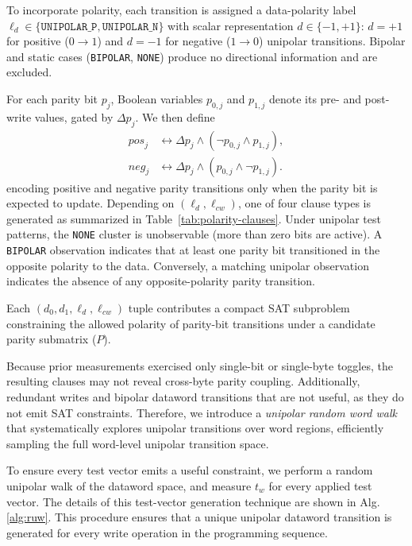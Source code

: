 \label{sec:sat-encoding}

To incorporate polarity, each transition is assigned a data-polarity label $\ell_d \in \{\texttt{UNIPOLAR\_P},\texttt{UNIPOLAR\_N}\}$ 
with scalar representation $d\in\{-1,+1\}$:
$d=+1$ for positive ($0{\rightarrow}1$) and $d=-1$ for negative ($1{\rightarrow}0$) unipolar transitions.
Bipolar and static cases (\texttt{BIPOLAR}, \texttt{NONE}) produce no directional information and are excluded.

For each parity bit $p_j$, Boolean variables $p_{0,j}$ and $p_{1,j}$ denote its pre- and post-write values, gated by $\Delta p_j$. 
We then define
{
\setlength{\abovedisplayskip}{1pt}
\setlength{\belowdisplayskip}{1pt}
\begin{align}
    \textit{pos}_j &\leftrightarrow \Delta p_j \wedge (\neg p_{0,j} \wedge p_{1,j}), \\
    \textit{neg}_j &\leftrightarrow \Delta p_j \wedge (p_{0,j} \wedge \neg p_{1,j}).
\end{align}
}
encoding positive and negative parity transitions only when the parity bit is expected to update.  
Depending on $(\ell_d,\ell_{cw})$, one of four clause types is generated as summarized in Table~\ref{tab:polarity-clauses}.  
Under unipolar test patterns, the \texttt{NONE} cluster is unobservable (more than zero bits are active). 
A \texttt{BIPOLAR} observation indicates that at least one parity bit transitioned in the opposite polarity to the data.
Conversely, a matching unipolar observation indicates the absence of any opposite-polarity parity transition.

Each $(d_0,d_1,\ell_d,\ell_{cw})$ tuple contributes a compact SAT subproblem constraining the allowed polarity of parity-bit transitions under a candidate parity submatrix ($P$).  

Because prior measurements exercised only single-bit or single-byte toggles, the resulting clauses may not reveal cross-byte parity coupling. Additionally, redundant writes and bipolar dataword transitions that are not useful, as they do not emit SAT constraints. Therefore, we introduce a \emph{unipolar random word walk} that systematically explores unipolar transitions over word regions, efficiently sampling the full word-level unipolar transition space.



\label{exp:2ii}
To ensure every test vector emits a useful constraint, we perform a random unipolar walk of the dataword space, and measure $t_{w}$ for every applied test vector. The details of this test-vector generation technique are shown in Alg. \ref{alg:ruw}. This procedure ensures that a unique unipolar dataword transition is generated for every write operation in the programming sequence.

